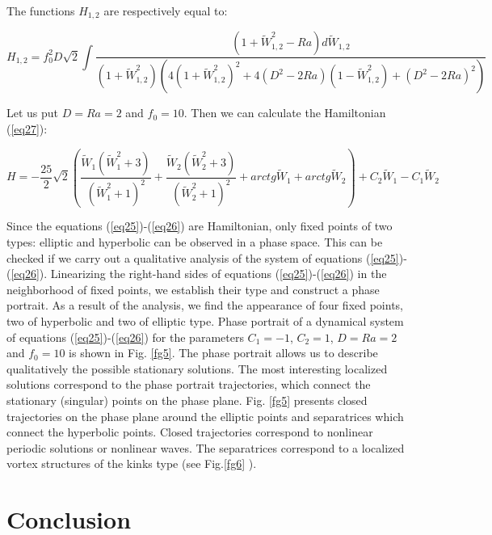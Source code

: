 \documentclass [12pt]{article}
\begin{document}
The functions  $H_{1,2} $   are respectively equal to:

\[H_{1,2}  = f_0^2 D\sqrt 2 \int {\frac{{(1 + \widetilde W_{1,2}^2  - Ra)d\widetilde W_{1,2} }}{{(1 + \widetilde W_{1,2}^2 )(4(1 + \widetilde W_{1,2}^2 )^2  + 4(D^2  - 2Ra)(1 - \widetilde W_{1,2}^2 ) + (D^2  - 2Ra)^2 )}}}\]

Let us put  $D=Ra=2$ and $f_{0} =10$. Then we  can calculate the Hamiltonian (\ref{eq27}):

\[H =  - \frac{{25}}{2}\sqrt 2 \left( {\frac{{\widetilde W_1 (\widetilde W_1^2  + 3)}}{{(\widetilde W_1^2  + 1)^2 }} + \frac{{\widetilde W_2 (\widetilde W_2^2  + 3)}}{{(\widetilde W_2^2  + 1)^2 }} + arctg\widetilde W_1  + arctg\widetilde W_2 } \right) + C_2 \widetilde W_1  - C_1 \widetilde W_2 \]

Since the equations (\ref{eq25})-(\ref{eq26})  are Hamiltonian, only fixed points of  two types: elliptic and hyperbolic can be observed in a phase space. This can be checked if we carry out a qualitative analysis of the system of equations (\ref{eq25})-(\ref{eq26}). Linearizing the right-hand sides of equations (\ref{eq25})-(\ref{eq26}) in the neighborhood of fixed points, we establish their type and construct a phase portrait. As a result of the analysis, we find the appearance of four fixed points, two of hyperbolic and two of elliptic type. Phase portrait of a dynamical system of equations (\ref{eq25})-(\ref{eq26}) for the parameters  $C_{1} =-1$, $C_{2} =1$,  $D=Ra=2$  and  $f_{0} =10$ is shown in Fig. \ref{fg5}. The phase portrait allows us to describe qualitatively the possible stationary solutions. The most interesting localized solutions correspond to the phase portrait trajectories, which connect the stationary (singular) points on the phase plane. Fig. \ref{fg5} presents closed trajectories on the phase plane around the elliptic points and separatrices which connect the hyperbolic points. Closed trajectories correspond to nonlinear periodic solutions or nonlinear waves.  The separatrices correspond  to a localized vortex structures of the kinks type (see Fig.\ref{fg6} ).



\section{Conclusion}
\end{document}
